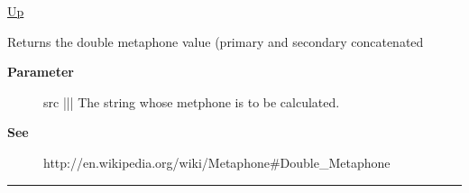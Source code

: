 \hyperlink{ecldoc:Metaphone}{Up}

\par
Returns the double metaphone value (primary and secondary concatenated

\par
\begin{description}
\item [\textbf{Parameter}] src ||| The string whose metphone is to be calculated.
\item [\textbf{See}] http://en.wikipedia.org/wiki/Metaphone\#Double\_Metaphone
\end{description}

\rule{\textwidth}{0.4pt}


